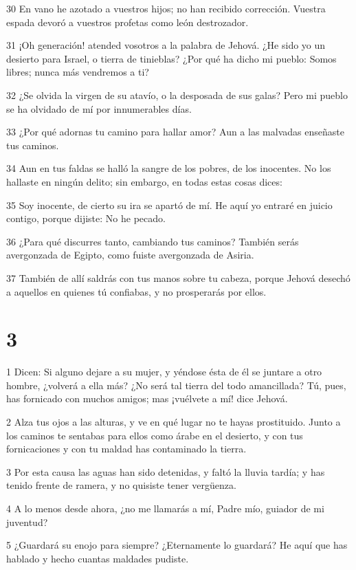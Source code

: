 \par 30 En vano he azotado a vuestros hijos; no han recibido corrección. Vuestra espada devoró a vuestros profetas como león destrozador.
\par 31 ¡Oh generación! atended vosotros a la palabra de Jehová. ¿He sido yo un desierto para Israel, o tierra de tinieblas? ¿Por qué ha dicho mi pueblo: Somos libres; nunca más vendremos a ti?
\par 32 ¿Se olvida la virgen de su atavío, o la desposada de sus galas? Pero mi pueblo se ha olvidado de mí por innumerables días.
\par 33 ¿Por qué adornas tu camino para hallar amor? Aun a las malvadas enseñaste tus caminos.
\par 34 Aun en tus faldas se halló la sangre de los pobres, de los inocentes. No los hallaste en ningún delito; sin embargo, en todas estas cosas dices:
\par 35 Soy inocente, de cierto su ira se apartó de mí. He aquí yo entraré en juicio contigo, porque dijiste: No he pecado.
\par 36 ¿Para qué discurres tanto, cambiando tus caminos? También serás avergonzada de Egipto, como fuiste avergonzada de Asiria.
\par 37 También de allí saldrás con tus manos sobre tu cabeza, porque Jehová desechó a aquellos en quienes tú confiabas, y no prosperarás por ellos.

\chapter{3}

\par 1 Dicen: Si alguno dejare a su mujer, y yéndose ésta de él se juntare a otro hombre, ¿volverá a ella más? ¿No será tal tierra del todo amancillada? Tú, pues, has fornicado con muchos amigos; mas ¡vuélvete a mí! dice Jehová.
\par 2 Alza tus ojos a las alturas, y ve en qué lugar no te hayas prostituido. Junto a los caminos te sentabas para ellos como árabe en el desierto, y con tus fornicaciones y con tu maldad has contaminado la tierra.
\par 3 Por esta causa las aguas han sido detenidas, y faltó la lluvia tardía; y has tenido frente de ramera, y no quisiste tener vergüenza.
\par 4 A lo menos desde ahora, ¿no me llamarás a mí, Padre mío, guiador de mi juventud?
\par 5 ¿Guardará su enojo para siempre? ¿Eternamente lo guardará? He aquí que has hablado y hecho cuantas maldades pudiste.

